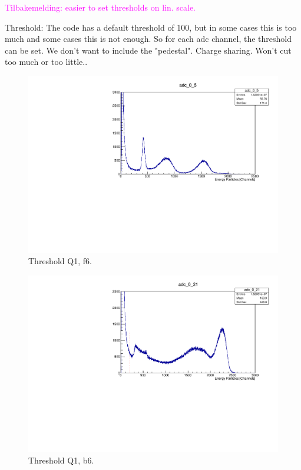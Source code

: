 \documentclass[twoside,english]{uiofysmaster/uiofysmaster}
\begin{document}
\textcolor{Magenta}{Tilbakemelding: \newline 
easier to set thresholds on lin. scale.
}

Threshold: The code has a default threshold of 100, but in some cases this is too much and some cases this is not enough. So for each adc channel, the threshold can be set. We don't want to include the "pedestal". Charge sharing.
Won't cut too much or too little..

\begin{figure}[ht]
	\centering
	\includegraphics[width=\textwidth]{../Plots/plotting/Threshold_Q1_f6.pdf}
	\caption{Threshold Q1, f6.}
	\label{fig:Threshold_f}
\end{figure}


\begin{figure}[ht]
	\centering
	\includegraphics[width=\textwidth]{../Plots/plotting/Threshold_Q1_b6.pdf}
	\caption{Threshold Q1, b6.}
	\label{fig:Threshold_b}
\end{figure}
\end{document}
